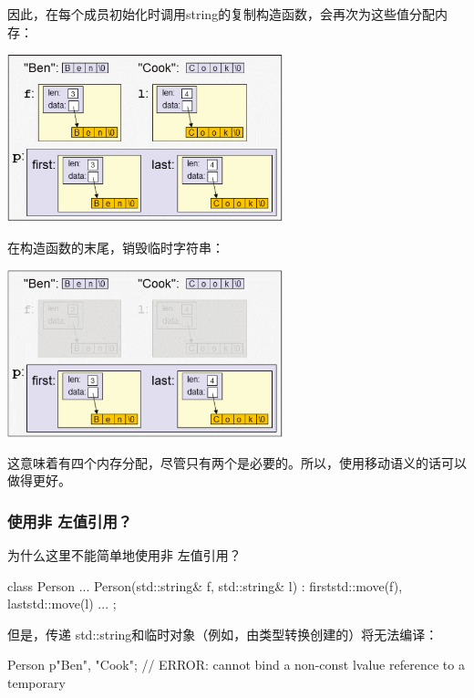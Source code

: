 因此，在每个成员初始化时调用string的复制构造函数，会再次为这些值分配内存：

\begin{center}
	\includegraphics[width=0.6\textwidth]{part1/ch4/images/2}
\end{center}

在构造函数的末尾，销毁临时字符串：

\begin{center}
	\includegraphics[width=0.6\textwidth]{part1/ch4/images/3}
\end{center}

这意味着有四个内存分配，尽管只有两个是必要的。所以，使用移动语义的话可以做得更好。

\subsubsection{使用非  左值引用？}

为什么这里不能简单地使用非  左值引用？

\begin{cppcode}
class Person {
	...
	Person(std::string& f, std::string& l)
	: first{std::move(f)}, last{std::move(l)} {
	}
	...
};
\end{cppcode}

但是，传递  std::string和临时对象（例如，由类型转换创建的）将无法编译：

\begin{cppcode}
Person p{"Ben", "Cook"}; // ERROR: cannot bind a non-const lvalue reference to a temporary
\end{cppcode}


